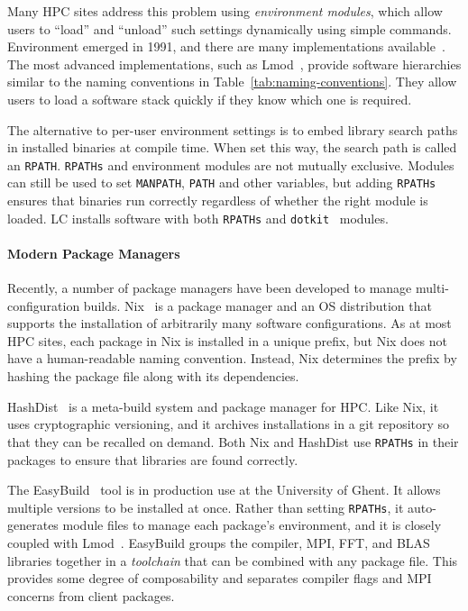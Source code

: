 Many HPC sites address this problem using {\it environment modules}, which
allow users to ``load'' and ``unload'' such settings dynamically using simple
commands. Environment emerged in 1991, and there are many implementations
available~\cite{dotkit,furlani+:lisa91,furlani+:lisa96,mclay:lmod,mclay:lmod-tutorial}.
The most advanced implementations, such as Lmod~\cite{mclay:lmod,mclay:lmod-tutorial},
provide software hierarchies similar to the naming conventions in
Table~\ref{tab:naming-conventions}. They allow users to load a software stack
quickly if they know which one is required.

The alternative to per-user environment settings is to embed library search
paths in installed binaries at compile time. When set this way, the search
path is called an {\tt RPATH}. {\tt RPATHs} and environment modules are not
mutually exclusive. Modules can still be used to set {\tt MANPATH}, {\tt PATH}
and other variables, but adding {\tt RPATHs} ensures that binaries run correctly
regardless of whether the right module is loaded. LC installs software with
both {\tt RPATHs} and {\tt dotkit}~\cite{dotkit} modules.

\paragraph{Modern Package Managers}

Recently, a number of package managers have been developed to manage
multi-configuration builds.
%
Nix~\cite{dolstra+:icfp08,dolstra+:lisa04}
is a package manager and an OS distribution that supports the installation of
arbitrarily many software configurations.  As at most HPC sites, each package
in Nix is installed in a unique prefix, but Nix does not have a human-readable
naming convention.  Instead, Nix determines the prefix by hashing the package
file along with its dependencies.

HashDist~\cite{hashdist} is a meta-build system and package manager for HPC.
Like Nix, it uses cryptographic versioning, and it archives installations
in a git repository so that they can be recalled on demand.
%
Both Nix and HashDist use {\tt RPATHs} in their packages to ensure that
libraries are found correctly.

The EasyBuild~\cite{hoste+:pyhpc12} tool is in production use at
the University of Ghent.  It allows multiple versions to be installed
at once.  Rather than setting {\tt RPATHs}, it auto-generates module files
to manage each package's environment, and it is closely coupled with
Lmod~\cite{geimer+:hust14}.  EasyBuild groups the compiler, MPI, FFT, and
BLAS libraries together in a {\it toolchain} that can be combined with
any package file. This provides some degree of composability and
separates compiler flags and MPI concerns from client packages.

